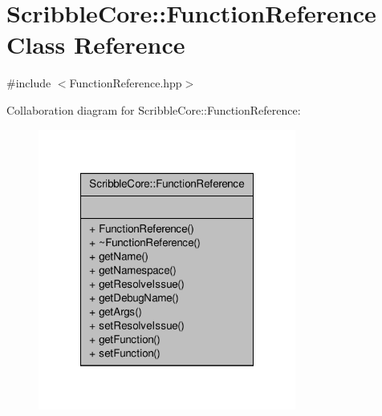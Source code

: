 \hypertarget{class_scribble_core_1_1_function_reference}{\section{Scribble\-Core\-:\-:Function\-Reference Class Reference}
\label{class_scribble_core_1_1_function_reference}
}


{\ttfamily \#include $<$Function\-Reference.\-hpp$>$}



Collaboration diagram for Scribble\-Core\-:\-:Function\-Reference\-:
\nopagebreak
\begin{figure}[H]
\begin{center}
\leavevmode
\includegraphics[width=240pt]{class_scribble_core_1_1_function_reference__coll__graph}
\end{center}
\end{figure}
